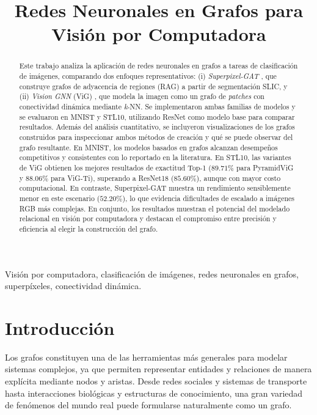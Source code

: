 \documentclass{article}
\title{Redes Neuronales en Grafos para Visión por Computadora}
\begin{document}
%
\maketitle
\pagestyle{plain}
\setcounter{page}{1}
%
\begin{abstract}
    Este trabajo analiza la aplicación de redes neuronales en grafos a tareas de clasificación de imágenes, comparando dos enfoques representativos: (i) \textit{Superpixel-GAT} \cite{avelar2020superpixel}, que construye grafos de adyacencia de regiones (RAG) a partir de segmentación SLIC, y (ii) \textit{Vision GNN} (ViG) \cite{han2022vision}, que modela la imagen como un grafo de \textit{patches} con conectividad dinámica mediante \textit{k}-NN. Se implementaron ambas familias de modelos y se evaluaron en MNIST y STL10, utilizando ResNet como modelo base para comparar resultados. Además del análisis cuantitativo, se incluyeron visualizaciones de los grafos construidos para inspeccionar ambos métodos de creación y qué se puede observar del grafo resultante. En MNIST, los modelos basados en grafos alcanzan desempeños competitivos y consistentes con lo reportado en la literatura. En STL10, las variantes de ViG obtienen los mejores resultados de exactitud Top-1 (\(89.71\%\) para PyramidViG y \(88.06\%\) para ViG-Ti), superando a ResNet18 (\(85.60\%\)), aunque con mayor costo computacional. En contraste, Superpixel-GAT muestra un rendimiento sensiblemente menor en este escenario (\(52.20\%\)), lo que evidencia dificultades de escalado a imágenes RGB más complejas. En conjunto, los resultados muestran el potencial del modelado relacional en visión por computadora y destacan el compromiso entre precisión y eficiencia al elegir la construcción del grafo.
\end{abstract}
%
\begin{keywords}
    Visión por computadora, clasificación de imágenes, redes neuronales en grafos, superpíxeles, conectividad dinámica.
\end{keywords}
%
\section{Introducción}
\label{sec:intro}

Los grafos constituyen una de las herramientas más generales para modelar sistemas complejos, ya que permiten representar entidades y relaciones de manera explícita mediante nodos y aristas. Desde redes sociales y sistemas de transporte hasta interacciones biológicas y estructuras de conocimiento, una gran variedad de fenómenos del mundo real puede formularse naturalmente como un grafo.
\end{document}
